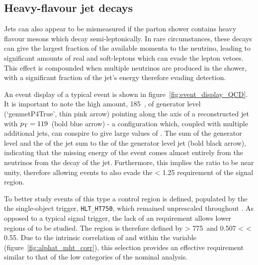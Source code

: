 \subsection{Heavy-flavour jet decays}

Jets can also appear to be mismeasured if the parton
shower contains heavy flavour mesons which decay semi-leptonically. In
rare
circumstances, these decays can give the largest fraction of the available
momenta to the neutrino, leading to significant amounts of real \met and
soft-leptons which can evade the lepton vetoes.
This effect is compounded when multiple neutrinos are produced in the shower,
with a significant fraction of the jet's energy therefore evading detection.

An event display of a typical event is shown in figure~\ref{fig:event_display_QCD}.
It is important to note the high amount, 185~\gev, of generator level
\met (`genmetP4True', thin pink arrow) pointing along the axis of a reconstructed
jet with ${p_{\text T}} = 119$~\gev (bold blue arrow) - a configuration which,
coupled with multiple additional jets, can conspire to give
large values of \alphat. The sum of the generator level \met and
the \Pt of the jet sum to the \Pt of the generator level jet (bold black arrow),
indicating that the missing energy of the event comes almost entirely from the
neutrinos from the decay of the jet. Furthermore, this implies the ratio
\mhtmet to be near unity, therefore allowing events to also evade the \mhtmet <
1.25 requirement of the signal region.

To better study events of this type a control region is defined, populated by
the the single-object \HT trigger, \verb!HLT_HT750!, which remained unprescaled
throughout \runone. As opposed to a typical signal trigger, the lack of an
\alphat requirement allows lower regions of \alphat to be studied. The region is
therefore defined by \HT > 775~\gev and 0.507 < \alphat < 0.55. Due to the
intrinsic correlation of \HT and \mht within the
\alphat variable (figure~\ref{fig:alphat_mht_corr}), this selection provides
an effective \mht requirement similar to that of the low \HT categories of the
nominal analysis.

